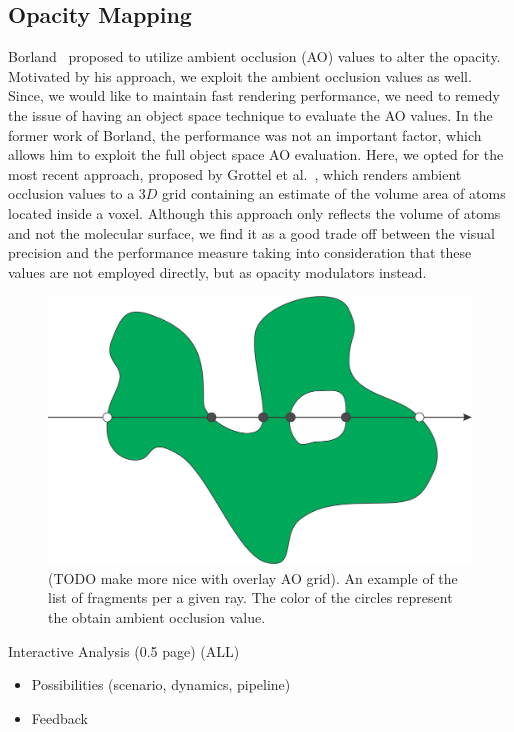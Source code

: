 \subsection{Opacity Mapping}
Borland~\cite{borland2011ambient} proposed to utilize ambient occlusion (AO) values to alter the opacity. Motivated by his approach, we exploit the ambient occlusion values as well. Since, we would like to maintain fast rendering performance, we need to remedy the issue of having an object space technique to evaluate the AO values. In the former work of Borland, the performance was not an important factor, which allows him to exploit the full object space AO evaluation. Here, we opted for the most recent approach, proposed by Grottel et al.~\cite{grottel2012object}, which renders ambient occlusion values to a $3D$ grid containing an estimate of the volume area of atoms located inside a voxel. Although this approach only reflects the volume of atoms and not the molecular surface, we find it as a good trade off between the visual precision and the performance measure taking into consideration that these values are not employed directly, but as opacity modulators instead.
	
\begin{figure}[htb]
\centering
  \includegraphics[width=0.8\columnwidth]{image/ray_fragments.png}
  \caption{(TODO make more nice with overlay AO grid). An example of the list of fragments per a given ray. The color of the circles represent the obtain ambient occlusion value.}
	\label{fig:ray_fragments}
\end{figure}

Interactive Analysis (0.5 page) (ALL)
\begin{itemize}
  \item Possibilities (scenario, dynamics, pipeline)
  \item Feedback
\end{itemize}

